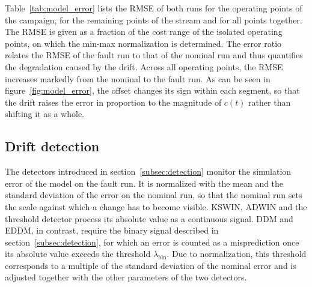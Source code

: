 %
Table~\ref{tab:model_error} lists the RMSE of both runs for the operating points of the campaign, for the remaining points of the stream and for all points together. The RMSE is given as a fraction of the cost range of the isolated operating points, on which the min-max normalization is determined. The error ratio relates the RMSE of the fault run to that of the nominal run and thus quantifies the degradation caused by the drift. Across all operating points, the RMSE increases markedly from the nominal to the fault run. As can be seen in figure~\ref{fig:model_error}, the offset changes its sign within each segment, so that the drift raises the error in proportion to the magnitude of $c(t)$ rather than shifting it as a whole. \par
%
\subsection{Drift detection} \label{subsec:eval_detection}
%
The detectors introduced in section~\ref{subsec:detection} monitor the simulation error of the model on the fault run. It is normalized with the mean and the standard deviation of the error on the nominal run, so that the nominal run sets the scale against which a change has to become visible. KSWIN, ADWIN and the threshold detector process its absolute value as a continuous signal. DDM and EDDM, in contrast, require the binary signal described in section~\ref{subsec:detection}, for which an error is counted as a misprediction once its absolute value exceeds the threshold $\lambda_\mathrm{bin}$. Due to normalization, this threshold corresponds to a multiple of the standard deviation of the nominal error and is adjusted together with the other parameters of the two detectors. \par
%
%
%
%
